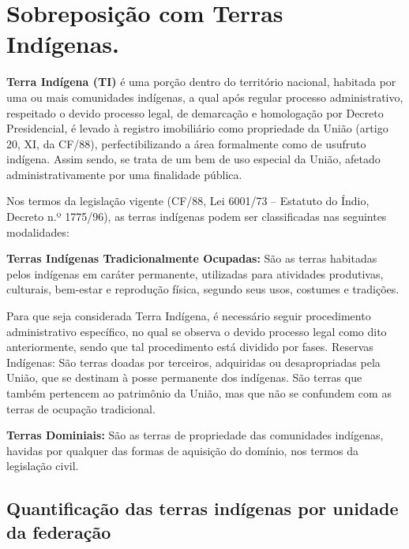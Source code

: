\documentclass[
  letterpaper,
]{report}
\begin{document}
\n  

\n


\hypertarget{sobreposiuxe7uxe3o-com-terras-induxedgenas.}{%
\chapter{Sobreposição com Terras
Indígenas.}\label{sobreposiuxe7uxe3o-com-terras-induxedgenas.}}

\textbf{Terra Indígena (TI)} é uma porção dentro do território nacional,
habitada por uma ou mais comunidades indígenas, a qual após regular
processo administrativo, respeitado o devido processo legal, de
demarcação e homologação por Decreto Presidencial, é levado à registro
imobiliário como propriedade da União (artigo 20, XI, da CF/88),
perfectibilizando a área formalmente como de usufruto indígena. Assim
sendo, se trata de um bem de uso especial da União, afetado
administrativamente por uma finalidade pública.

Nos termos da legislação vigente (CF/88, Lei 6001/73 -- Estatuto do
Índio, Decreto n.º 1775/96), as terras indígenas podem ser classificadas
nas seguintes modalidades:

\textbf{Terras Indígenas Tradicionalmente Ocupadas:} São as terras
habitadas pelos indígenas em caráter permanente, utilizadas para
atividades produtivas, culturais, bem-estar e reprodução física, segundo
seus usos, costumes e tradições.

Para que seja considerada Terra Indígena, é necessário seguir
procedimento administrativo específico, no qual se observa o devido
processo legal como dito anteriormente, sendo que tal procedimento está
dividido por fases. Reservas Indígenas: São terras doadas por terceiros,
adquiridas ou desapropriadas pela União, que se destinam à posse
permanente dos indígenas. São terras que também pertencem ao patrimônio
da União, mas que não se confundem com as terras de ocupação
tradicional.

\textbf{Terras Dominiais:} São as terras de propriedade das comunidades
indígenas, havidas por qualquer das formas de aquisição do domínio, nos
termos da legislação civil.

\hypertarget{quantificauxe7uxe3o-das-terras-induxedgenas-por-unidade-da-federauxe7uxe3o}{%
\section{Quantificação das terras indígenas por unidade da
federação}\label{quantificauxe7uxe3o-das-terras-induxedgenas-por-unidade-da-federauxe7uxe3o}}
\end{document}
